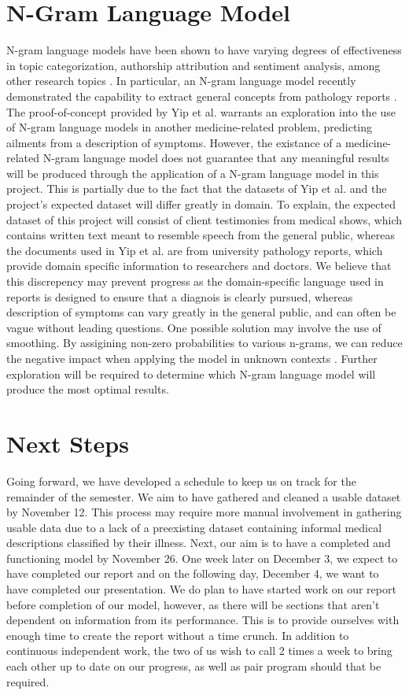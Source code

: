 \documentclass[12pt, final, onecolumn, comsoc, conference]{IEEEtran}
\begin{document}
\section{N-Gram Language Model} N-gram language models have been shown to have
varying degrees of effectiveness in topic categorization, authorship attribution
and sentiment analysis, among other research topics \cite{n-gram-analysis}. In
particular, an N-gram language model recently demonstrated the capability to
extract general concepts from pathology reports \cite{yip}. The proof-of-concept
provided by Yip et al. warrants an exploration into the use of N-gram language
models in another medicine-related problem, predicting ailments from a
description of symptoms. However, the existance of a medicine-related N-gram
language model does not guarantee that any meaningful results will be produced
through the application of a N-gram language model in this project. This is
partially due to the fact that the datasets of Yip et al. and the project's
expected dataset will differ greatly in domain. To explain, the expected dataset
of this project will consist of client testimonies from medical shows, which
contains written text meant to resemble speech from the general public, whereas
the documents used in Yip et al. are from university pathology reports, which
provide domain specific information to researchers and doctors. We believe that
this discrepency may prevent progress as the domain-specific language used in
reports is designed to ensure that a diagnois is clearly pursued, whereas
description of symptoms can vary greatly in the general public, and can often be
vague without leading questions. One possible solution may involve the use of
smoothing. By assigining non-zero probabilities to various n-grams, we can
reduce the negative impact when applying the model in unknown contexts
\cite{class}. Further exploration will be required to determine which N-gram
language model will produce the most optimal results.

\section{Next Steps}
Going forward, we have developed a schedule to keep us on track for the remainder of the semester. We aim to have gathered and cleaned a usable dataset by November 12.
This process may require more manual involvement in gathering usable data due to a lack of a preexisting dataset containing informal medical descriptions classified by their illness. Next, our aim is to have a completed and functioning model by November 26.
One week later on December 3, we expect to have completed our report and on the following day, December 4, we want to have completed our presentation. We do plan to have started work on our report before completion of our model, however, as there will be sections that aren’t dependent on information from its performance.
This is to provide ourselves with enough time to create the report without a time crunch. In addition to continuous independent work, the two of us wish to call 2 times a week to bring each other up to date on our progress, as well as pair program should that be required.


\end{document}
